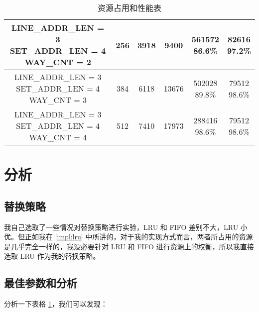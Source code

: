 \documentclass{article}
\begin{document}
\begin{table}[H]
\begin{tabular}{c c c c c c}
    \midrule
    \makecell{LINE\_ADDR\_LEN = 3 \\ SET\_ADDR\_LEN = 4 \\ WAY\_CNT = 2} & 256 & 3918 & 9400 & \makecell{561572 \\ 86.6\%} & \makecell{82616\\ 97.2\%}\\
    \midrule
    \makecell{LINE\_ADDR\_LEN = 3 \\ SET\_ADDR\_LEN = 4 \\ WAY\_CNT = 3} & 384 & 6118 & 13676 & \makecell{502028 \\ 89.8\%} & \makecell{79512\\ 98.6\%}\\
    \midrule
    \makecell{LINE\_ADDR\_LEN = 3 \\ SET\_ADDR\_LEN = 4 \\ WAY\_CNT = 4} & 512 & 7410 & 17973 & \makecell{288416 \\ 98.6\%} & \makecell{79512\\ 98.6\%}\\
    \bottomrule
  \end{tabular}
  \caption{资源占用和性能表}
  \label{table:util_perf}
\end{table}

\section{分析}

\subsection{替换策略}

我自己选取了一些情况对替换策略进行实验，LRU 和 FIFO 差别不大，LRU 小优。但正如我在 \ref{impl:lru} 中所讲的，对于我的实现方式而言，两者所占用的资源是几乎完全一样的，我没必要针对 LRU 和 FIFO 进行资源上的权衡，所以我直接选取 LRU 作为我的替换策略。

\subsection{最佳参数和分析}

分析一下表格 \ref{table:util_perf}，我们可以发现：
\end{document}
